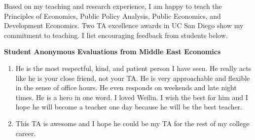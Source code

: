 \documentclass[letterpaper]{article}
\begin{document}
Based on my teaching and research experience, I am happy to teach the Principles of Economics, Public Policy Analysis, Public Economics, and Development Economics. Two TA excellence awards in UC San Diego show my commitment to teaching. I list encouraging feedback from students below.

\textbf{Student Anonymous Evaluations from Middle East Economics}
\begin{enumerate}
\item He is the most respectful, kind, and patient person I have seen. He really acts like he is your close friend, not your TA. He is very approachable and flexible in the sense of office hours. He even responds on weekends and late night times. He is a hero in one word. I loved Weilin. I wish the best for him and I hope he will become a teacher one day because he will be the best teacher.
\item This TA is awesome and I hope he could be my TA for the rest of my college career.
\end{enumerate}
\end{document}
